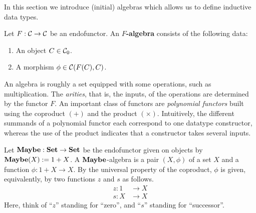 In this section we introduce (initial) algebras which allows us to define inductive data types.

\begin{dfn} Let $F:\mathcal{C}\to \mathcal{C}$ be an endofunctor. An \textbf{$F$-algebra} consists of the following data:
\begin{enumerate}
\item An object $C\in {\mathcal{C}}_0$.
\item A morphism $\phi \in {\mathcal{C}}(F(C),C)$.
\end{enumerate}
\end{dfn}

\begin{intu}
An algebra is roughly a set equipped with some operations, such as multiplication.
The \emph{arities}, that is, the inputs, of the operations are determined by the functor $F$.
An important class of functors are \emph{polynomial functors} built using the coproduct $(+)$ and the product $(\times)$.
Intuitively, the different summands of a polynomial functor each correspond to one datatype constructor, whereas the use of the product indicates that a constructor takes several inputs.
\end{intu}

\begin{exa}\label{exa:nno_initial_alg_maybe}
 Let $\mathbf{Maybe} : \mathbf{Set} \to \mathbf{Set}$ be the endofunctor given on objects by $\mathbf{Maybe}(X) := 1 + X$. 
 A $\mathbf{Maybe}$-algebra is a pair $(X,\phi)$ of a set $X$ and a function $\phi : 1 + X \to X$.
 By the universal property of the coproduct, $\phi$ is given, equivalently,
 by two functions $z$ and $s$ as follows.
 \begin{align*}
    z : 1 &\to X
    \\
    s : X &\to X
 \end{align*}
Here, think of ``$z$'' standing for ``zero'', and ``$s$'' standing for ``successor''.
\end{exa}


